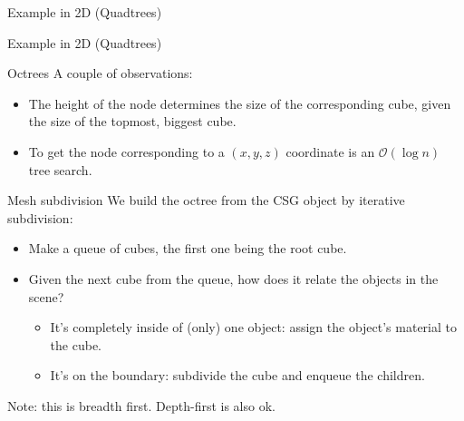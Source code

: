 \documentclass[utf8x]{beamer}
\begin{document}
\begin{frame}{Example in 2D (Quadtrees)}
\begin{center}
\end{center}
\end{frame}

\begin{frame}{Example in 2D (Quadtrees)}
\begin{center}
\end{center}
\end{frame}

\begin{frame}{Octrees}
A couple of observations:
\begin{itemize}
\item The height of the node determines the size of the corresponding cube,
      given the size of the topmost, biggest cube.
\item To get the node corresponding to a $(x,y,z)$ coordinate is an 
      $\mathcal{O}(\log n)$ tree search.
\end{itemize} 
\end{frame}

\begin{frame}{Mesh subdivision}
We build the octree from the CSG object by iterative subdivision:
\begin{itemize}
\item Make a queue of cubes, the first one being the root cube.
\item Given the next cube from the queue, how does it relate the objects in 
      the scene?
      \begin{itemize}
      \item It's completely inside of (only) one object: assign the object's 
            material to the cube.
      \item It's on the boundary: subdivide the cube and enqueue the children.
      \end{itemize}
\end{itemize}
Note: this is breadth first. Depth-first is also ok.
\end{frame}
\end{document}
